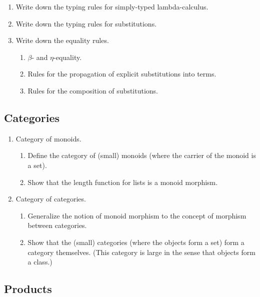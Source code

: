 \documentclass[a4paper,fleqn]{scrartcl}
\begin{document}
\begin{enumerate}
\item Write down the typing rules for simply-typed lambda-calculus.
\item Write down the typing rules for substitutions.
\item Write down the equality rules.
  \begin{enumerate}
  \item $\beta$- and $\eta$-equality.
  \item Rules for the propagation of explicit substitutions into
    terms.
  \item Rules for the composition of substitutions.
  \end{enumerate}
\end{enumerate}

\subsection{Categories}

\begin{enumerate}

\item Category of monoids.
  \begin{enumerate}
  \item Define the category of (small) monoids (where the carrier of
    the monoid is a set).
  \item Show that the length function for lists is a monoid morphism.
  \end{enumerate}

\item Category of categories.
  \begin{enumerate}
  \item Generalize the notion of monoid morphism to the concept of
    morphism between categories.
  \item Show that the (small) categories (where the objects form a
    set) form a category themselves.  (This category is large in the
    sense that objects form a class.)
  \end{enumerate}

\end{enumerate}

\subsection{Products}

\newcommand{\C}{\mathcal{C}}
\end{document}
